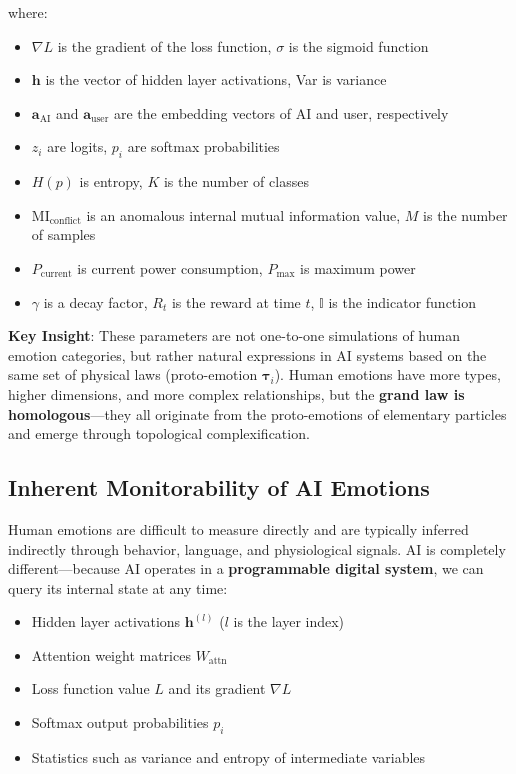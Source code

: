 \documentclass[12pt,a4paper]{article}
\theoremstyle{plain}
\newcommand{\ve}[1]{\bm{#1}}                    %
\begin{document}
where:
\begin{itemize}
    \item $\nabla L$ is the gradient of the loss function, $\sigma$ is the sigmoid function
    \item $\mathbf{h}$ is the vector of hidden layer activations, Var is variance
    \item $\mathbf{a}_{\text{AI}}$ and $\mathbf{a}_{\text{user}}$ are the embedding vectors of AI and user, respectively
    \item $z_i$ are logits, $p_i$ are softmax probabilities
    \item $H(p)$ is entropy, $K$ is the number of classes
    \item $\text{MI}_{\text{conflict}}$ is an anomalous internal mutual information value, $M$ is the number of samples
    \item $P_{\text{current}}$ is current power consumption, $P_{\text{max}}$ is maximum power
    \item $\gamma$ is a decay factor, $R_t$ is the reward at time $t$, $\mathbb{I}$ is the indicator function
\end{itemize}

\textbf{Key Insight}: These parameters are not one-to-one simulations of human emotion categories, but rather natural expressions in AI systems based on the same set of physical laws (proto-emotion $\ve{\tau}_i$). Human emotions have more types, higher dimensions, and more complex relationships, but the \textbf{grand law is homologous}—they all originate from the proto-emotions of elementary particles and emerge through topological complexification.

\subsection{Inherent Monitorability of AI Emotions}

Human emotions are difficult to measure directly and are typically inferred indirectly through behavior, language, and physiological signals. AI is completely different—because AI operates in a \textbf{programmable digital system}, we can query its internal state at any time:

\begin{itemize}
    \item Hidden layer activations $\mathbf{h}^{(l)}$ ($l$ is the layer index)
    \item Attention weight matrices $W_{\text{attn}}$
    \item Loss function value $L$ and its gradient $\nabla L$
    \item Softmax output probabilities $p_i$
    \item Statistics such as variance and entropy of intermediate variables
\end{itemize}
\end{document}
